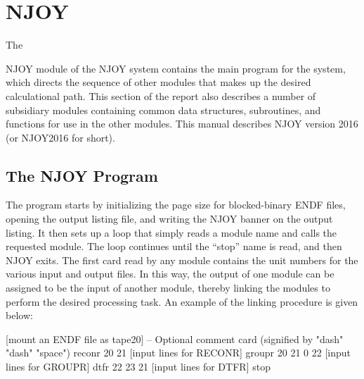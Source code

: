 \section{NJOY}
\label{sNJOY}

\hypertarget{sNJOYhy}{The}
NJOY module of the NJOY system contains the main program for the
system, which directs the sequence of other modules that makes up the
desired calculational path.  This section of the report also describes
a number of subsidiary modules containing common data structures,
subroutines, and functions for use in the other modules.  This manual
describes NJOY version 2016
(or NJOY2016 for short).

\subsection{The NJOY Program}
\label{ssNJOY}

The  program starts by initializing the page size
for blocked-binary ENDF files, opening the output listing file,
and writing the NJOY banner on the output listing.  It then sets
up a loop that simply reads a module name and calls the requested module.
The loop continues until the ``stop'' name is read, and then NJOY exits.
The first card read by any module contains the unit numbers for the
various input and output files.  In this way, the output of one module
can be assigned to be the input of another module, thereby linking the
modules to perform the desired processing task.  An example of the
linking procedure is given below:

\small
\begin{ccode}

     [mount an ENDF file as tape20]
   -- Optional comment card (signified by "dash" "dash" "space")
   reconr
   20 21
     [input lines for RECONR]
   groupr
   20 21 0 22
     [input lines for GROUPR]
   dtfr
   22 23 21
     [input lines for DTFR]
   stop

\end{ccode}
\normalsize


